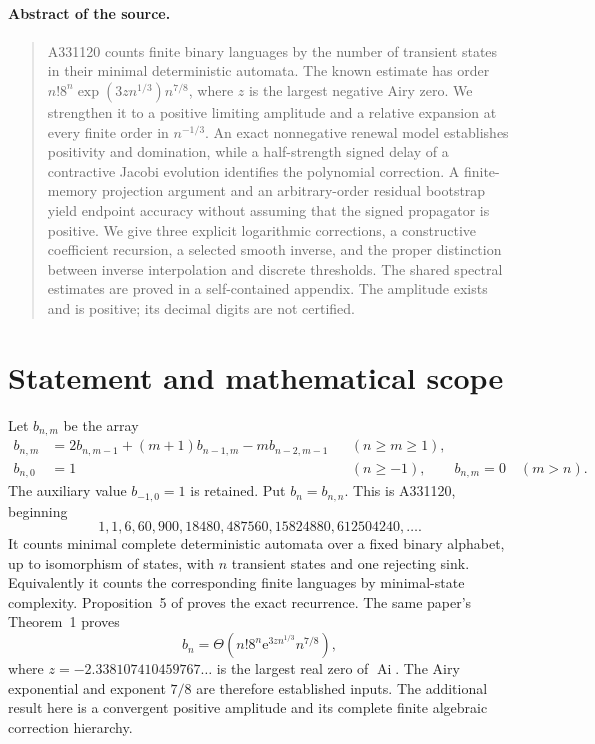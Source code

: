\documentclass[11pt,letterpaper]{article}
\numberwithin{equation}{section}
\theoremstyle{remark}
\newcommand{\Ai}{\operatorname{Ai}}
\newcommand{\ee}{\mathrm e}
\begin{document}
\paragraph{Abstract of the source.}
\begin{quote}\small
A331120 counts finite binary languages by the number of transient states in
their minimal deterministic automata. The known estimate has order
$n!8^n\exp(3zn^{1/3})n^{7/8}$, where $z$ is the largest negative Airy zero.
We strengthen it to a positive limiting amplitude and a relative expansion
at every finite order in $n^{-1/3}$. An exact nonnegative renewal model
establishes positivity and domination, while a half-strength signed delay
of a contractive Jacobi evolution identifies the polynomial correction.
A finite-memory projection argument and an arbitrary-order residual
bootstrap yield endpoint accuracy without assuming that the signed
propagator is positive. We give three explicit logarithmic corrections,
a constructive coefficient recursion, a selected smooth inverse, and the
proper distinction between inverse interpolation and discrete thresholds.
The shared spectral estimates are proved in a self-contained appendix.
The amplitude exists and is positive; its decimal digits are not certified.
\end{quote}


\section{Statement and mathematical scope}\label{air:dfa:sec:statement}
Let $b_{n,m}$ be the array
\begin{equation}\label{air:dfa:eq:b-count}
\begin{aligned}
b_{n,m}&=2b_{n,m-1}+(m+1)b_{n-1,m}-m b_{n-2,m-1}
&& (n\ge m\ge1),\\
b_{n,0}&=1 &&(n\ge-1),\qquad b_{n,m}=0\quad(m>n).
\end{aligned}
\end{equation}
The auxiliary value $b_{-1,0}=1$ is retained. Put $b_n=b_{n,n}$.
This is A331120, beginning
\[
1,1,6,60,900,18480,487560,15824880,612504240,\ldots.
\]
It counts minimal complete deterministic automata over a fixed binary
alphabet, up to isomorphism of states, with $n$ transient states and one
rejecting sink. Equivalently it counts the corresponding finite languages
by minimal-state complexity. Proposition~5 of \cite{dfa} proves the exact
recurrence. The same paper's Theorem~1 proves
\begin{equation}\label{air:dfa:eq:known-theta}
b_n=\Theta\!\left(n!8^n\ee^{3zn^{1/3}}n^{7/8}\right),
\end{equation}
where $z=-2.338107410459767\ldots$ is the largest real zero of $\Ai$.
The Airy exponential and exponent $7/8$ are therefore established inputs.
The additional result here is a convergent positive amplitude and its
complete finite algebraic correction hierarchy.
\end{document}
